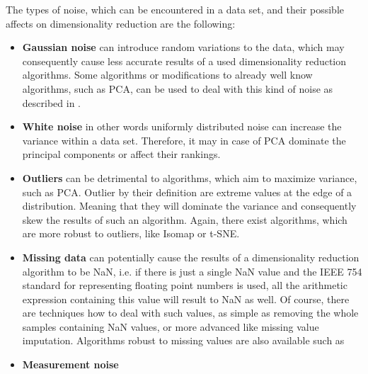 \documentclass[a4paper,10pt]{article}\setlength{\textheight}{10in}\setlength{\textwidth}{6.5in}\setlength{\topmargin}{-0.125in}\setlength{\oddsidemargin}{-.2in}\setlength{\evensidemargin}{-.2in}\setlength{\headsep}{0.2in}\setlength{\footskip}{0pt}\usepackage{amsmath}\usepackage{fancyhdr}\usepackage{enumitem}\usepackage{hyperref}\usepackage{xcolor}\usepackage{graphicx}\pagestyle{fancy}
\begin{document}
\begin{enumerate}[topsep=0mm, partopsep=0mm, leftmargin=*]
The types of noise, which can be encountered in a data set, and their possible affects on dimensionality reduction are the following:
\begin{itemize}
    \item \textbf{Gaussian noise} can introduce random variations to the data, which may consequently cause less accurate results of a used dimensionality reduction algorithms. Some algorithms or modifications to already well know algorithms, such as PCA, can be used to deal with this kind of noise as described in \cite{bailey2012}.
    \item \textbf{White noise} in other words uniformly distributed noise can increase the variance within a data set. Therefore, it may in case of PCA dominate the principal components or affect their rankings. 
    \item \textbf{Outliers} can be detrimental to algorithms, which aim to maximize variance, such as PCA. Outlier by their definition are extreme values at the edge of a distribution. Meaning that they will dominate the variance and consequently skew the results of such an algorithm. Again, there exist algorithms, which are more robust to outliers, like Isomap or t-SNE.
    \item \textbf{Missing data} can potentially cause the results of a dimensionality reduction algorithm to be NaN, i.e. if there is just a single NaN value and the IEEE 754 standard for representing floating point numbers is used, all the arithmetic expression containing this value will result to NaN as well. Of course, there are techniques how to deal with such values, as simple as removing the whole samples containing NaN values, or more advanced like missing value imputation. Algorithms robust to missing values are also available such as 
    \item \textbf{Measurement noise} 
\end{itemize}


\end{enumerate}
\end{document}
